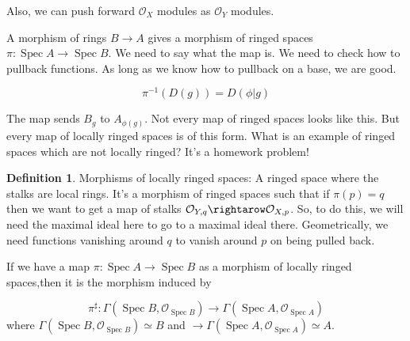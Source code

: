 \documentclass{book}
\renewcommand{\O}{\ensuremath{\mathcal{O}}}
\newcommand{\Spec}{\operatorname{Spec}}
\newcommand{\spec}{\operatorname{Spec}}
\theoremstyle{definition}
\newtheorem{definition}[theorem]{Definition}
\begin{document}
Also, we can push forward $\O_X$ modules as $\O_Y$ modules.


A morphism of rings $B \rightarrow A$ gives a morphism of ringed spaces
$\pi: \Spec A \rightarrow \spec B$. We need to say what the map is. We need
to check how to pullback functions. As long as we know how to pullback on a 
base, we are good.

$$
\pi^{-1}(D(g)) = D(\phi|g)
$$

The map sends $B_g$ to $A_{\phi(g)}$. Not every map of ringed spaces looks
like this. But every map of locally ringed spaces is of this form.
What is an example of ringed spaces which are not locally ringed? It's a homework
problem!

\begin{definition}
Morphisms of locally ringed spaces: A ringed space where the stalks are local
rings. It's a morphism of ringed spaces such that if $\pi(p) = q$ then
we want to get a map of stalks $\O_{Y, q} \rightarow \O_{X, p}$. So, 
to do this, we will need the maximal ideal here to go to a maximal ideal
there. Geometrically, we need functions vanishing around $q$ to vanish around $p$
on being pulled back.
\end{definition}

If we have a map $\pi: \Spec A \rightarrow \spec B$ as a morphism of locally
ringed spaces,then it is the morphism induced by 

$$
\pi^{\sharp}:  \Gamma(\Spec B, \O_{\spec B}) \rightarrow \Gamma (\Spec A, \O_{\spec A})
$$
where $\Gamma(\Spec B, \O_{\spec B}) \simeq B$ and $\rightarrow \Gamma (\Spec A, \O_{\spec A}) \simeq A$.
\end{document}
